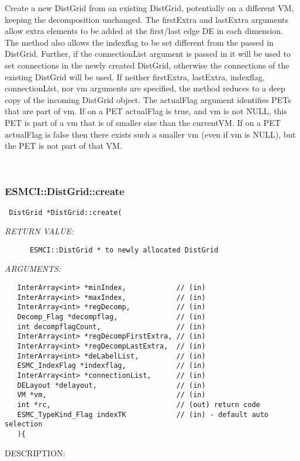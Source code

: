       Create a new DistGrid from an existing DistGrid, potentially on a
      different VM, keeping the decomposition unchanged. The firstExtra 
      and lastExtra arguments allow extra elements to be added at the 
      first/last edge DE in each dimension. The method also allows the 
      indexflag to be set different from the passed in DistGrid. Further, 
      if the connectionList argument is passed in it will be used to set
      connections in the newly created DistGrid, otherwise the connections
      of the existing DistGrid will be used.
      If neither firstExtra, lastExtra, indexflag, connectionList, nor vm
      arguments are specified, the method reduces to a deep copy of the
      incoming DistGrid object.
      The actualFlag argument identifies PETs that are part of vm. If
      on a PET actualFlag is true, and vm is not NULL, this PET is part of a
      vm that is of smaller size than the currentVM. If on a PET actualFlag is
      false then there exists such a smaller vm (even if vm is NULL), but the
      PET is not part of that VM.
   
 
\mbox{}\hrulefill\
 
\subsubsection [ESMCI::DistGrid::create] {ESMCI::DistGrid::create}


  
\begin{verbatim} DistGrid *DistGrid::create(\end{verbatim}{\em RETURN VALUE:}
\begin{verbatim}      ESMCI::DistGrid * to newly allocated DistGrid\end{verbatim}{\em ARGUMENTS:}
\begin{verbatim}   InterArray<int> *minIndex,            // (in)
   InterArray<int> *maxIndex,            // (in)
   InterArray<int> *regDecomp,           // (in)
   Decomp_Flag *decompflag,              // (in)
   int decompflagCount,                  // (in)
   InterArray<int> *regDecompFirstExtra, // (in)
   InterArray<int> *regDecompLastExtra,  // (in)
   InterArray<int> *deLabelList,         // (in)
   ESMC_IndexFlag *indexflag,            // (in)
   InterArray<int> *connectionList,      // (in)
   DELayout *delayout,                   // (in)
   VM *vm,                               // (in)
   int *rc,                              // (out) return code
   ESMC_TypeKind_Flag indexTK            // (in) - default auto selection
   ){\end{verbatim}
{\sf DESCRIPTION:\\ }


